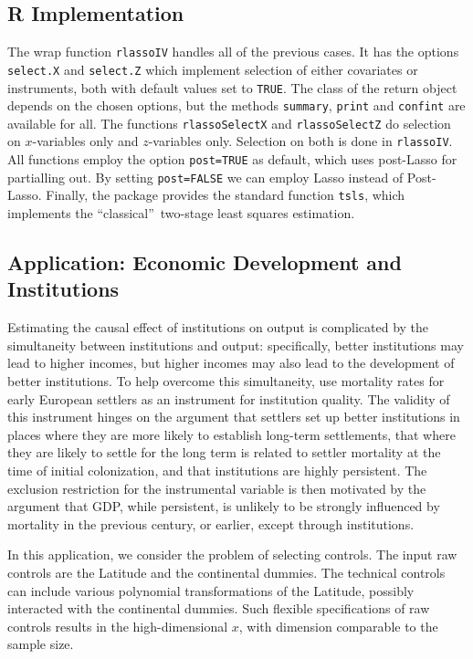\documentclass{amsart}\usepackage[]{graphicx}\usepackage[]{color}
\newcommand{\code}[1]{\texttt{#1}}
\begin{document}
\subsection*{R Implementation}
 The wrap function \code{rlassoIV} handles all of the previous cases. It has the options \code{select.X} and \code{select.Z} which implement selection of either covariates or instruments, both with default values set to \code{TRUE}. The class of the return object depends on the chosen options, but the methods \code{summary}, \code{print} and \code{confint} are available for all. The functions \code{rlassoSelectX} and \code{rlassoSelectZ} do selection on  $x$-variables only and  $z$-variables only. Selection on both is done in \code{rlassoIV}. All functions employ the option \code{post=TRUE} as default, which 
 uses post-Lasso for partialling out.  By setting \code{post=FALSE}
 we can employ Lasso instead of Post-Lasso. Finally, the package provides the standard function \code{tsls}, which implements the \textquotedblleft classical\textquotedblright\ two-stage least squares estimation.

\subsection{Application: Economic Development and Institutions}
Estimating the causal effect of institutions on output is complicated by the simultaneity between institutions and output: specifically, better institutions may
lead to higher incomes, but higher incomes may also lead to the development of
better institutions. To help overcome this simultaneity, \citet{acemoglu:colonial} use mortality rates for early European settlers as an instrument
for institution quality. The validity of this instrument hinges on the argument that
settlers set up better institutions in places where they are more likely to establish
long-term settlements, that where they are likely to settle for the long term is related
to settler mortality at the time of initial colonization, and that institutions are highly
persistent. The exclusion restriction for the instrumental variable is then motivated
by the argument that GDP, while persistent, is unlikely to be strongly influenced by
mortality in the previous century, or earlier, except through institutions.


In this application, we consider the problem of selecting
controls. The input raw controls are the Latitude and the continental dummies. The technical controls can include various polynomial transformations of the Latitude, possibly interacted with the continental dummies. Such flexible specifications of raw controls results in the high-dimensional $x$, with dimension comparable to the sample size.
\end{document}
